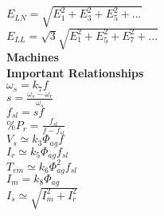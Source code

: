\documentclass[a4paper, 10pt]{article}
\begin{document}
\begin{paracol}{3}[]
$E_{LN} = \sqrt{E_1^2 + E_3^2 +E_5^2 + ...}$\\
$E_{LL} = \sqrt{3}\sqrt{E_1^2 + E_5^2 +E_7^2 + ...}$\\

\switchcolumn
\newpage
\textbf{Machines}\\
\textbf{Important Relationships}\\
$\omega_s=k_7f$\\
$s=\frac{\omega_s-\omega_r}{\omega_s}$\\
$f_{sl} = sf$\\
$\%P_r=\frac{f_{sl}}{f-f_{sl}}$\\
$V_s \simeq k_3 \Phi_{ag}f$\\
$I_r \simeq k_5 \Phi_{ag}f_{sl}$\\
$T_{em} \simeq k_6 \Phi_{ag}^2f_{sl}$\\
$I_m = k_8\Phi_{ag}$\\
$I_s \simeq \sqrt{I_m^2+I_r^2}$\\

\end{paracol}




\end{document}
